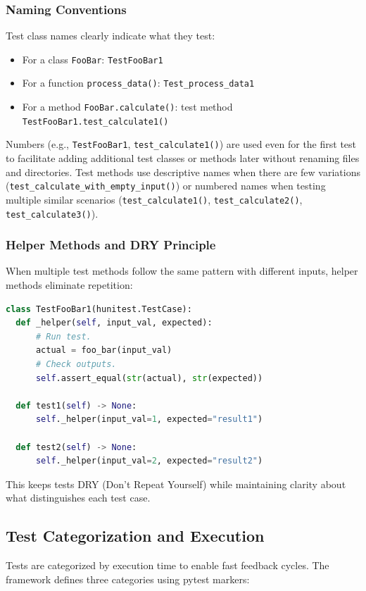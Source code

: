\subsubsection{Naming Conventions}
Test class names clearly indicate what they test:
\begin{itemize}
  \item For a class \texttt{FooBar}: \texttt{TestFooBar1}

  \item For a function \texttt{process\_data()}: \texttt{Test\_process\_data1}

  \item For a method \texttt{FooBar.calculate()}: test method \texttt{TestFooBar1.test\_calculate1()}
\end{itemize}
Numbers (e.g., \texttt{TestFooBar1}, \texttt{test\_calculate1()}) are used
even for the first test to facilitate adding additional test classes or methods
later without renaming files and directories. Test methods use
descriptive names when there are few variations (\texttt{test\_calculate\_with\_empty\_input()})
or numbered names when testing multiple similar scenarios (\texttt{test\_calculate1()},
\texttt{test\_calculate2()}, \texttt{test\_calculate3()}).

\subsubsection{Helper Methods and DRY Principle}
When multiple test methods follow the same pattern with different inputs,
helper methods eliminate repetition:

\begin{lstlisting}[language=Python]
class TestFooBar1(hunitest.TestCase):
  def _helper(self, input_val, expected):
      # Run test.
      actual = foo_bar(input_val)
      # Check outputs.
      self.assert_equal(str(actual), str(expected))

  def test1(self) -> None:
      self._helper(input_val=1, expected="result1")

  def test2(self) -> None:
      self._helper(input_val=2, expected="result2")
\end{lstlisting}

This keeps tests DRY (Don't Repeat Yourself) while maintaining clarity about
what distinguishes each test case.

\subsection{Test Categorization and Execution}
Tests are categorized by execution time to enable fast feedback cycles. The
framework defines three categories using pytest markers:


